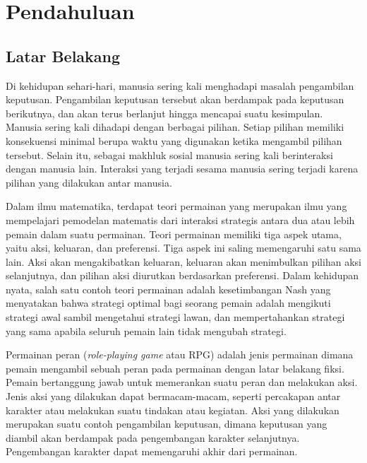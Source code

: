 \chapter{Pendahuluan}

\section{Latar Belakang}
\label{sec:latarbelakang}

Di kehidupan sehari-hari, manusia sering kali menghadapi masalah pengambilan keputusan. Pengambilan keputusan tersebut akan berdampak pada keputusan berikutnya, dan akan terus berlanjut hingga mencapai suatu kesimpulan. Manusia sering kali dihadapi dengan berbagai pilihan. Setiap pilihan memiliki konsekuensi minimal berupa waktu yang digunakan ketika mengambil pilihan tersebut. Selain itu, sebagai makhluk sosial manusia sering kali berinteraksi dengan manusia lain. Interaksi yang terjadi sesama manusia sering terjadi karena pilihan yang dilakukan antar manusia.


Dalam ilmu matematika, terdapat teori permainan yang merupakan ilmu yang mempelajari pemodelan matematis dari interaksi strategis antara dua atau lebih pemain dalam suatu permainan. Teori permainan memiliki tiga aspek utama, yaitu aksi, keluaran, dan preferensi. Tiga aspek ini saling memengaruhi satu sama lain. Aksi akan mengakibatkan keluaran, keluaran akan menimbulkan pilihan aksi selanjutnya, dan pilihan aksi diurutkan berdasarkan preferensi. Dalam kehidupan nyata, salah satu contoh teori permainan adalah kesetimbangan Nash yang menyatakan bahwa strategi optimal bagi seorang pemain adalah mengikuti strategi awal sambil mengetahui strategi lawan, dan mempertahankan strategi yang sama apabila seluruh pemain lain tidak mengubah strategi.

Permainan peran (\textit{role-playing game} atau RPG) adalah jenis permainan dimana pemain mengambil sebuah peran pada permainan dengan latar belakang fiksi. Pemain bertanggung jawab untuk memerankan suatu peran dan melakukan aksi. Jenis aksi yang dilakukan dapat bermacam-macam, seperti percakapan antar karakter atau melakukan suatu tindakan atau kegiatan. Aksi yang dilakukan merupakan suatu contoh pengambilan keputusan, dimana keputusan yang diambil akan berdampak pada pengembangan karakter selanjutnya. Pengembangan karakter dapat memengaruhi akhir dari permainan.


